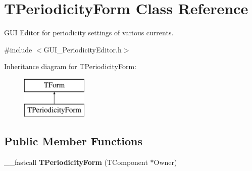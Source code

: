 \hypertarget{class_t_periodicity_form}{\section{T\+Periodicity\+Form Class Reference}
\label{class_t_periodicity_form}
}


G\+U\+I Editor for periodicity settings of various currents.  




{\ttfamily \#include $<$G\+U\+I\+\_\+\+Periodicity\+Editor.\+h$>$}

Inheritance diagram for T\+Periodicity\+Form\+:\begin{figure}[H]
\begin{center}
\leavevmode
\includegraphics[height=2.000000cm]{class_t_periodicity_form}
\end{center}
\end{figure}
\subsection*{Public Member Functions}
\begin{DoxyCompactItemize}
\item 
\hypertarget{class_t_periodicity_form_a45622b2dd251e376d852d18a61d955e4}{\+\_\+\+\_\+fastcall {\bfseries T\+Periodicity\+Form} (T\+Component $\ast$Owner)}\label{class_t_periodicity_form_a45622b2dd251e376d852d18a61d955e4}

\end{DoxyCompactItemize}
